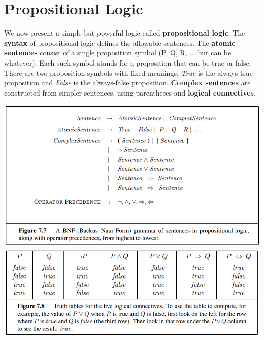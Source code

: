 \section{Propositional Logic}
We now present a simple but powerful logic called \textbf{propositional logic}. The \textbf{syntax} of propositional logic defines the allowable sentences. The \textbf{atomic sentences} consist of a single proposition symbol (P, Q, R, ... but can be whatever). Each such symbol stands for a proposition that can be true or false. There are two proposition symbols with fixed meanings: \textit{True} is the always-true proposition and \textit{False} is the always-false proposition. \textbf{Complex sentences} are constructed from simpler sentences, using parentheses and \textbf{logical connectives}.
\begin{center}
    \includegraphics[scale=0.8]{images/BNF.png}
    \includegraphics[scale=0.8]{images/truth-table.png}
\end{center}

